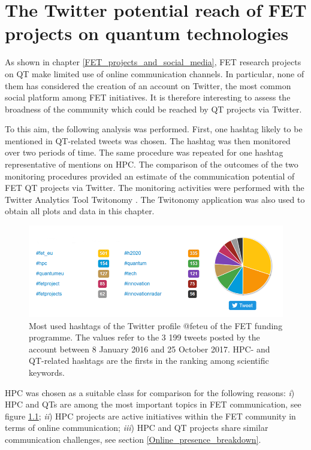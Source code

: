 \chapter{The Twitter potential reach of FET projects on quantum technologies}
As shown in chapter \ref{FET_projects_and_social_media}, FET research projects on QT make limited use of online communication channels. In particular, none of them has considered the creation of an account on Twitter, the most common social platform among FET initiatives. It is therefore interesting to assess the broadness of the community which could be reached by QT projects via Twitter.

To this aim, the following analysis was performed. First, one hashtag likely to be mentioned in QT-related tweets was chosen. The hashtag was then monitored over two periods of time. The same procedure was repeated for one hashtag representative of mentions on HPC. The comparison of the outcomes of the two monitoring procedures provided an estimate of the communication potential of FET QT projects via Twitter. The monitoring activities were performed with the Twitter Analytics Tool Twitonomy \cite{Twitonomy}. The Twitonomy application was also used to obtain all plots and data in this chapter.

\begin{figure}[!t] 
 \begin{center}
 \includegraphics[scale=0.5]{Images/Hashtags_feteu.png}
 \caption{Most used hashtags of the Twitter profile @fet\textunderscore eu of the FET funding programme. The values refer to the 3 199 tweets posted by the account between 8 January 2016 and 25 October 2017. HPC- and QT-related hashtags are the firsts in the ranking among scientific keywords.}
 \label{Hashtags_feteu}
 \end{center}
\end{figure}

HPC was chosen as a suitable class for comparison for the following reasons: \textit{i}) HPC and QTs are among the most important topics in FET communication, see figure \ref{Hashtags_feteu}; \textit{ii}) HPC projects are active initiatives within the FET community in terms of online communication; \textit{iii}) HPC and QT projects share similar communication challenges, see section \ref{Online_presence_breakdown}.


